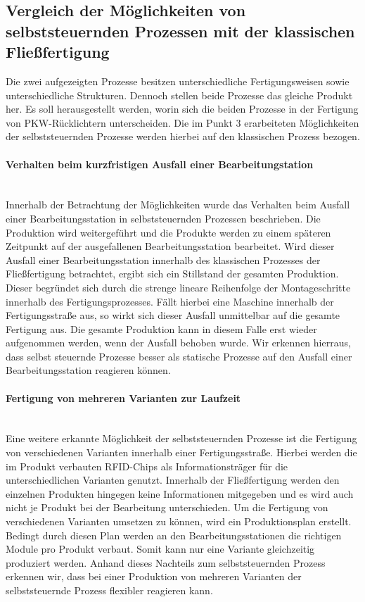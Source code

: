 \subsection{Vergleich der Möglichkeiten von selbststeuernden Prozessen mit der klassischen Fließfertigung}
\label{sec:Vergleich_der_Moeglichkeiten}

Die zwei aufgezeigten Prozesse besitzen unterschiedliche Fertigungsweisen sowie
unterschiedliche Strukturen. Dennoch stellen beide Prozesse das gleiche Produkt
her. Es soll herausgestellt werden, worin sich die beiden Prozesse in der
Fertigung von PKW-Rücklichtern unterscheiden. Die im Punkt 3 erarbeiteten
Möglichkeiten der selbststeuernden Prozesse werden hierbei auf den klassischen
Prozess bezogen.

\paragraph{Verhalten beim kurzfristigen Ausfall einer Bearbeitungstation} \hfill
\\
Innerhalb der Betrachtung der Möglichkeiten wurde das Verhalten beim Ausfall
einer Bearbeitungsstation in selbststeuernden Prozessen beschrieben. Die
Produktion wird weitergeführt und die Produkte werden zu einem späteren
Zeitpunkt auf der ausgefallenen  Bearbeitungsstation bearbeitet. Wird dieser
Ausfall einer Bearbeitungsstation innerhalb des klassischen Prozesses der
Fließfertigung betrachtet, ergibt sich ein Stillstand der gesamten Produktion.
Dieser begründet sich durch die strenge lineare Reihenfolge der Montageschritte
innerhalb des Fertigungsprozesses. Fällt hierbei eine Maschine innerhalb der
Fertigungsstraße aus, so wirkt sich dieser Ausfall unmittelbar auf die gesamte
Fertigung aus. Die gesamte Produktion kann in diesem Falle erst wieder
aufgenommen werden, wenn der Ausfall behoben wurde. Wir erkennen hierraus, dass
selbst steuernde Prozesse besser als statische Prozesse  auf den Ausfall einer
Bearbeitungsstation reagieren können.

\paragraph{Fertigung von mehreren Varianten zur Laufzeit} \hfill \\
Eine weitere erkannte Möglichkeit der selbststeuernden Prozesse ist die
Fertigung von verschiedenen Varianten innerhalb einer Fertigungsstraße. Hierbei
werden die im Produkt verbauten RFID-Chips als Informationsträger für die
unterschiedlichen Varianten genutzt. Innerhalb der Fließfertigung werden den
einzelnen Produkten hingegen keine Informationen mitgegeben und es wird auch
nicht je Produkt bei der Bearbeitung unterschieden. Um die Fertigung von
verschiedenen Varianten umsetzen zu können, wird ein Produktionsplan erstellt.
Bedingt durch diesen Plan werden an den Bearbeitungsstationen die richtigen
Module pro Produkt verbaut. Somit kann nur eine Variante gleichzeitig
produziert werden. Anhand dieses Nachteils zum selbststeuernden Prozess
erkennen wir, dass bei einer Produktion von mehreren Varianten der
selbststeuernde Prozess flexibler reagieren kann.



